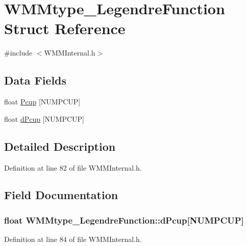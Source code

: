 \hypertarget{struct_w_m_mtype___legendre_function}{\section{W\-M\-Mtype\-\_\-\-Legendre\-Function Struct Reference}
\label{struct_w_m_mtype___legendre_function}
}


{\ttfamily \#include $<$W\-M\-M\-Internal.\-h$>$}

\subsection*{Data Fields}
\begin{DoxyCompactItemize}
\item 
float \hyperlink{struct_w_m_mtype___legendre_function_a3059147ef5db575cff502086ffd6181e}{Pcup} \mbox{[}N\-U\-M\-P\-C\-U\-P\mbox{]}
\item 
float \hyperlink{struct_w_m_mtype___legendre_function_a8f1880bdef934eee3bd52155cd214343}{d\-Pcup} \mbox{[}N\-U\-M\-P\-C\-U\-P\mbox{]}
\end{DoxyCompactItemize}


\subsection{Detailed Description}


Definition at line 82 of file W\-M\-M\-Internal.\-h.



\subsection{Field Documentation}
\hypertarget{struct_w_m_mtype___legendre_function_a8f1880bdef934eee3bd52155cd214343}{
\subsubsection[{d\-Pcup}]{\setlength{\rightskip}{0pt plus 5cm}float W\-M\-Mtype\-\_\-\-Legendre\-Function\-::d\-Pcup\mbox{[}N\-U\-M\-P\-C\-U\-P\mbox{]}}}\label{struct_w_m_mtype___legendre_function_a8f1880bdef934eee3bd52155cd214343}


Definition at line 84 of file W\-M\-M\-Internal.\-h.

